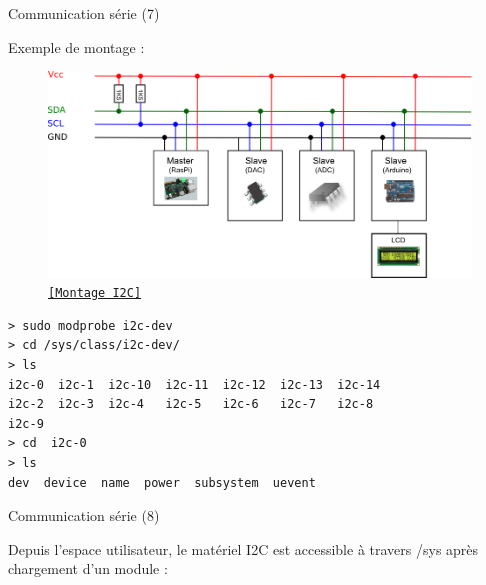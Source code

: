 \documentclass[12pt, t]{beamer}
\newcommand{\src}[2]{\vspace{-10pt}\caption{\href{#1}{\centering \tt \tiny [#2]}}}
\begin{document}
\begin{frame}{Communication série (7)}

    \vspace{15pt}
    Exemple de montage :
    \begin{figure}
        \centering
        \includegraphics[scale=0.3]{i2c.png}
        \src{http://quick2wire.com/articles/i2c-and-spi/}{Montage I2C}
    \end{figure}

\end{frame}

{
    \begin{lstlisting}
> sudo modprobe i2c-dev
> cd /sys/class/i2c-dev/
> ls
i2c-0  i2c-1  i2c-10  i2c-11  i2c-12  i2c-13  i2c-14
i2c-2  i2c-3  i2c-4   i2c-5   i2c-6   i2c-7   i2c-8
i2c-9
> cd  i2c-0
> ls
dev  device  name  power  subsystem  uevent
    \end{lstlisting}
}

\begin{frame}{Communication série (8)}

    \vspace{15pt}
    Depuis l'espace utilisateur, le matériel I2C est accessible à travers /sys
    après chargement d'un module :

    \vspace{10pt}
    \lstiic

\end{frame}
\end{document}
